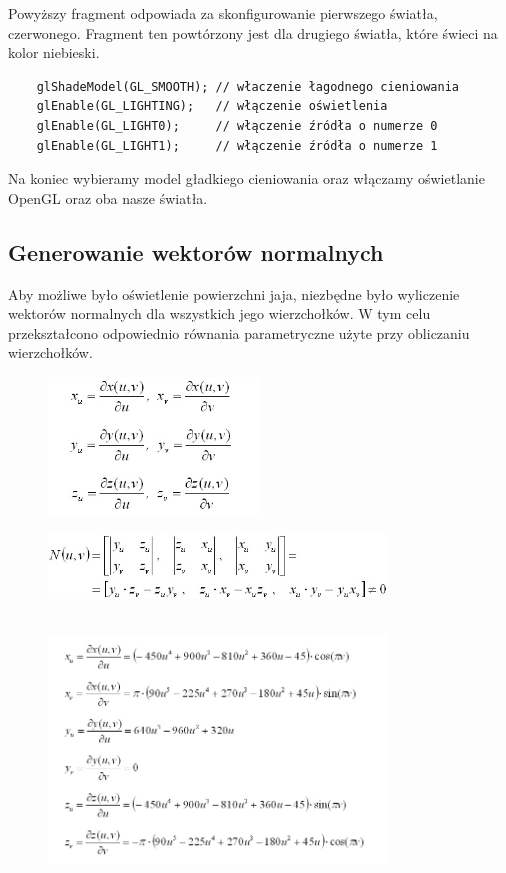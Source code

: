 \documentclass[a4paper]{article}
\begin{document}
Powyższy fragment odpowiada za skonfigurowanie pierwszego światła, czerwonego.
Fragment ten powtórzony jest dla drugiego światła, które świeci na kolor
niebieski.

\begin{verbatim}
    glShadeModel(GL_SMOOTH); // właczenie łagodnego cieniowania
    glEnable(GL_LIGHTING);   // włączenie oświetlenia
    glEnable(GL_LIGHT0);     // włączenie źródła o numerze 0
    glEnable(GL_LIGHT1);     // włączenie źródła o numerze 1
\end{verbatim}

Na koniec wybieramy model gładkiego cieniowania oraz włączamy oświetlanie OpenGL
oraz oba nasze światła.

\subsection{Generowanie wektorów normalnych}

Aby możliwe było oświetlenie powierzchni jaja, niezbędne było wyliczenie
wektorów normalnych dla wszystkich jego wierzchołków. W tym celu przekształcono
odpowiednio równania parametryczne użyte przy obliczaniu wierzchołków.

\begin{figure}[H]
    \centering
    \includegraphics[width=0.5\textwidth]{wzor_4}
\end{figure}
\begin{figure}[H]
    \centering
    \includegraphics[width=0.8\textwidth]{wzor_3}
\end{figure}
\begin{figure}[H]
    \centering
    \includegraphics[width=0.8\textwidth,height=7cm]{wzor_5}
\end{figure}
\end{document}
